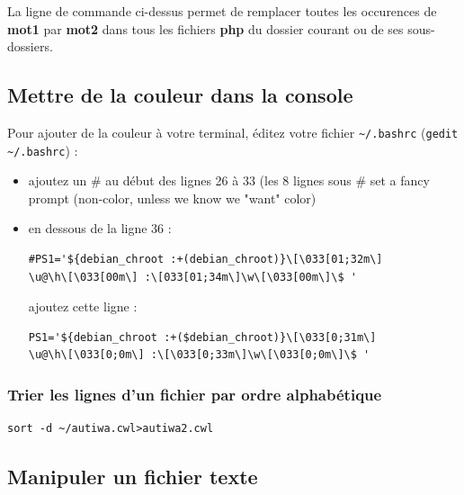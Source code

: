 \documentclass[a4paper,twoside]{article}
\begin{document}
La ligne de commande ci-dessus permet de remplacer toutes les occurences de \textbf{mot1} par \textbf{mot2} dans tous les fichiers \textbf{php} du dossier courant ou de ses sous-dossiers.


\subsection{Mettre de la couleur dans la console}
Pour ajouter de la couleur à votre terminal, éditez votre fichier \verb|~/.bashrc| (\verb|gedit ~/.bashrc|) :
\begin{itemize}
\item ajoutez un \# au début des lignes 26 à 33 (les 8 lignes sous \# set a fancy prompt (non-color, unless we know we "want" color)
\item en dessous de la ligne 36 :

\begin{verbatim}
#PS1='${debian_chroot :+(debian_chroot)}\[\033[01;32m\]
\u@\h\[\033[00m\] :\[033[01;34m\]\w\[\033[00m\]\$ '\end{verbatim}

ajoutez cette ligne :

\begin{verbatim}
PS1='${debian_chroot :+($debian_chroot)}\[\033[0;31m\]
\u@\h\[\033[0;0m\] :\[\033[0;33m\]\w\[\033[0;0m\]\$ '
\end{verbatim}
\end{itemize}

\subsubsection{Trier les lignes d'un fichier par ordre alphabétique}

\begin{verbatim}
sort -d ~/autiwa.cwl>autiwa2.cwl
\end{verbatim}


\subsection{Manipuler un fichier texte}
\end{document}
